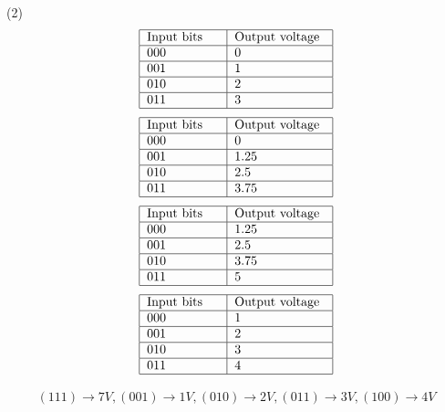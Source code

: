 \begin{enumerate}
{	}
\begin{tasks}(2)
\task[\textbf{A.}] 
\begin{align*}
\begin{tabular}{|p{2cm} |p{2.5cm}|}
\hline
Input bits& Output voltage\\\hline
000&0\\	\hline
001&1\\	\hline
010&2\\	\hline
011&3\\	\hline
\end{tabular}
\end{align*}
\task[\textbf{B.}] 	\begin{align*}
\begin{tabular}{|p{2cm} |p{2.5cm}|}
\hline
Input bits& Output voltage\\\hline
000&0\\	\hline
001&1.25\\	\hline
010&2.5\\	\hline
011&3.75\\	\hline
\end{tabular}
\end{align*}
\task[\textbf{C.}] 	\begin{align*}
\begin{tabular}{|p{2cm} |p{2.5cm}|}
\hline
Input bits& Output voltage\\\hline
000&1.25\\	\hline
001&2.5\\	\hline
010&3.75\\	\hline
011&5\\	\hline
\end{tabular}
\end{align*}
\task[\textbf{D.}] 	\begin{align*}
\begin{tabular}{|p{2cm} |p{2.5cm}|}
\hline
Input bits& Output voltage\\\hline
000&1\\	\hline
001&2\\	\hline
010&3\\	\hline
011&4\\	\hline
\end{tabular}
\end{align*}
\end{tasks}
\begin{answer}
\begin{align*}
(111) \rightarrow 7 V,(001) \rightarrow 1 V,(010) \rightarrow 2 V,(011) \rightarrow 3 V,(100) \rightarrow 4 V

\end{align*}
\end{answer}
\end{enumerate}
